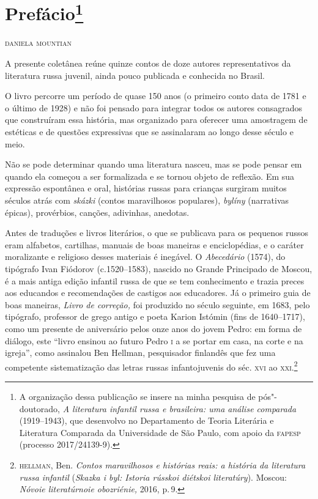 \chapter{Prefácio\footnote{A
  organização dessa publicação se insere na minha pesquisa de
  pós"-doutorado, \emph{A literatura infantil russa e brasileira: uma
  análise comparada} (1919--1943), que desenvolvo no Departamento
  de Teoria Literária e Literatura Comparada da Universidade de São
  Paulo, com apoio da \textsc{fapesp} (processo 2017/24139-9).}} \label{part0}

\begingroup\small
\begin{flushright}
\hfill\textsc{daniela mountian}
\end{flushright}


\noindent{}A presente coletânea reúne quinze contos de doze autores representativos da
literatura russa juvenil, ainda pouco publicada e conhecida
no Brasil.

O livro percorre um período de quase 150 anos (o primeiro conto data de
1781 e o último de 1928) e não foi pensado para integrar todos os
autores consagrados que construíram essa história, mas organizado para
oferecer uma amostragem de estéticas e de questões expressivas que se
assinalaram ao longo desse século e meio.

Não se pode determinar quando uma literatura nasceu, mas se pode pensar
em quando ela começou a ser formalizada e se tornou objeto de reflexão.
Em sua expressão espontânea e oral, histórias russas para crianças
surgiram muitos séculos atrás com \emph{skázki} (contos maravilhosos
populares), \emph{bylíny} (narrativas épicas), provérbios,
canções, adivinhas, anedotas.

Antes de traduções e livros literários, o que se publicava para os
pequenos russos eram alfabetos, cartilhas, manuais de boas maneiras e
enciclopédias, e o caráter moralizante e religioso desses materiais é
inegável. O \emph{Abecedário} (1574), do tipógrafo Ivan Fiódorov
(c.1520--1583), nascido no Grande Principado de Moscou, é a mais antiga
edição infantil russa de que se tem conhecimento e trazia preces aos
educandos e recomendações de castigos aos educadores. Já o primeiro guia
de boas maneiras, \emph{Livro de correção,} foi produzido no século
seguinte, em 1683, pelo tipógrafo, professor de grego antigo e poeta
Karion Istómin (fins de 1640--1717), como um presente de aniversário
pelos onze anos do jovem Pedro: em forma de diálogo, este ``livro
ensinou ao futuro Pedro \textsc{i} a se portar em casa, na corte e na igreja'',
como assinalou Ben Hellman, pesquisador finlandês que fez uma competente
sistematização das letras russas infantojuvenis do séc. \textsc{xvi} ao
\textsc{xxi}.\footnote{\textsc{hellman}, Ben. \emph{Contos maravilhosos e histórias reais:
  a história da literatura russa infantil} (\emph{Skazka i byl: Istoria
  rússkoi diétskoi literatúry}). Moscou: \emph{Nóvoie
  literatúrnoie obozriénie,} 2016, p.\,9.}

